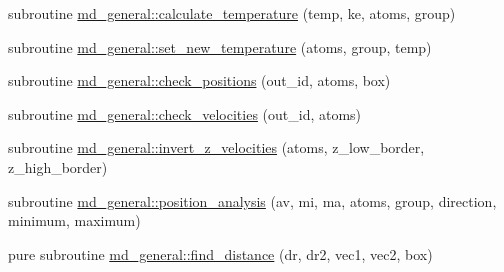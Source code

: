\begin{DoxyCompactItemize}
\item 
subroutine \mbox{\hyperlink{namespacemd__general_a1de2d09f44a8dc5b96fc5eb221845cc1}{md\+\_\+general\+::calculate\+\_\+temperature}} (temp, ke, atoms, group)
\item 
subroutine \mbox{\hyperlink{namespacemd__general_a9f99fa4920c9047597f37b777dd44b3c}{md\+\_\+general\+::set\+\_\+new\+\_\+temperature}} (atoms, group, temp)
\item 
subroutine \mbox{\hyperlink{namespacemd__general_ac9e62480edf60d2b3d1a123c9da68e1f}{md\+\_\+general\+::check\+\_\+positions}} (out\+\_\+id, atoms, box)
\item 
subroutine \mbox{\hyperlink{namespacemd__general_abd425450c2140a07748c79f0f0dbd760}{md\+\_\+general\+::check\+\_\+velocities}} (out\+\_\+id, atoms)
\item 
subroutine \mbox{\hyperlink{namespacemd__general_aca48dc12ea3fb99991acd82c2223a9bf}{md\+\_\+general\+::invert\+\_\+z\+\_\+velocities}} (atoms, z\+\_\+low\+\_\+border, z\+\_\+high\+\_\+border)
\item 
subroutine \mbox{\hyperlink{namespacemd__general_a5dc45690a2125a86ce58d01601ebdf45}{md\+\_\+general\+::position\+\_\+analysis}} (av, mi, ma, atoms, group, direction, minimum, maximum)
\item 
pure subroutine \mbox{\hyperlink{namespacemd__general_a33570f37733690b0634f039ad1bcf35e}{md\+\_\+general\+::find\+\_\+distance}} (dr, dr2, vec1, vec2, box)
\end{DoxyCompactItemize}
